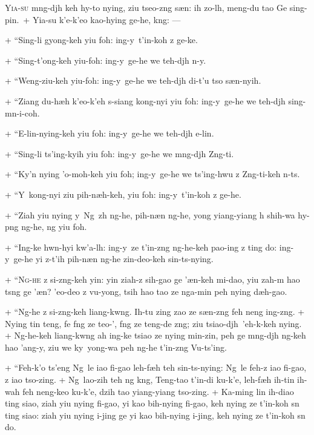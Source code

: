 \header
\lettrine{Y}{ia-su} m\oo ng-dj\oo h keh hy\y-to nying, ziu tseo-z\oo ng s\ae n: ih zo-l\oo h, meng-du tao Ge sing-pin.\
+	Yia-su k'e-k'eo kao-hy\y ing ge-he, k\oo ng: ---
\par
+	``Sing-li gy\y ong-keh yiu foh: ing-y\y\ t'in-koh z ge-ke.
\par
+	``Sing-t'ong-keh yiu-foh: ing-y\y\ ge-he we teh-dj\oo h \e n-y\y.
\par
+	``Weng-ziu-keh yiu-foh: ing-y\y\ ge-he we teh-dj\oo h di-t'u tso s\ae n-nyih.
\par
+	``Ziang du-h\ae h k'eo-k'eh s-siang kong-nyi yiu foh: ing-y\y\ ge-he we teh-dj\oo h sing-m\e n-i-coh.
\par
+	``E-lin-nying-keh yiu foh: ing-y\y\ ge-he we teh-dj\oo h e-lin.
\par
+	``Sing-li ts'ing-kyih yiu foh: ing-y\y\ ge-he we m\oo ng-dj\oo h Z\oo ng-ti.
\par
+	``Ky'\y n nying 'o-moh-keh yiu foh; ing-y\y\ ge-he we ts'ing-hwu z Z\oo ng-ti-keh n-ts.
\par
+	``Y\y\ kong-nyi ziu pih-n\ae h-keh, yiu foh: ing-y\y\ t'in-koh z ge-he.
\par
+	``Ziah yiu nying y\y\ Ng\oo\ z\oo h ng-he, pih-n\ae n ng-he, y\y ong yiang-yiang \oo h shih-wa hy\y-p\oo ng ng-he,
	ng yiu foh.
\par
+	``Ing-ke hw\e n-hyi kw'a-l\oo h: ing-y\y\ ze t'in-z\oo ng ng-he-keh pao-ing z ting do: ing-y\y\ ge-he yi z-t'ih
	pih-n\ae n ng-he zin-deo-keh sin-ts-nying.
\par
+	``\textsc{Ng-he} z si-z\oo ng-keh yin: yin ziah-z sih-gao ge '\ae n-keh mi-dao, yiu zah-m hao ts\oo ng ge '\ae n?
	'eo-deo z vu-y\y ong, tsih hao tao ze nga-min peh nying d\ae h-gao.
\par
+	``Ng-he z si-z\oo ng-keh liang-kw\oo ng. Ih-tu zing zao ze s\ae n-z\oo ng feh neng ing-z\oo ng.
+	Nying tin teng, fe f\oo ng ze teo-'\oo, f\oo ng ze teng-de z\oo ng; ziu tsiao-dj\oo h\ 'eh-k\oo-keh nying.
+	Ng-he-keh liang-kw\oo ng ah ing-ke tsiao ze nying min-zin, peh ge m\oo ng-dj\oo h ng-keh hao 'ang-y\y,
	ziu we ky\y\ y\y ong-wa peh ng-he t'in-z\oo ng Vu-ts'ing.
\par
+	``Feh-k'o ts'eng Ng\oo\ le iao fi-gao leh-f\ae h teh sin-ts-nying: Ng\oo\ le feh-z iao fi-gao, z iao tso-zing.
+	Ng\oo\ lao-zih teh ng k\oo ng, Teng-tao t'in-di ku-k'e, leh-f\ae h ih-tin ih-wah feh neng-keo ku-k'e, dzih tao
	yiang-yiang tso-zing.
+	Ka-ming lin ih-diao ting siao, ziah yiu nying fi-gao, yi kao bih-nying fi-gao, keh nying ze t'in-koh s\e n ting siao:
	ziah yiu nying i-jing ge yi kao bih-nying i-jing, keh nying ze t'in-koh s\e n do.
